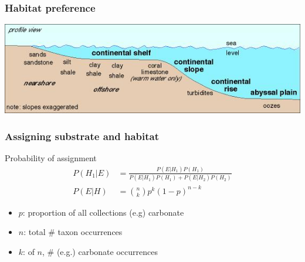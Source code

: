 \documentclass{beamer}
\begin{document}
\begin{frame}
  \frametitle{Habitat preference}
  \begin{center}
    \includegraphics[height = 0.8\textheight, width = \textwidth, keepaspectratio = true]{figure/coast_dep}

    \tiny{}
  \end{center}
\end{frame}

\begin{frame}
  \frametitle{Assigning substrate and habitat}

  \begin{block}{Probability of assignment}
    \begin{align*}
      P(H_{1}|E) &= \frac{P(E|H_{1})P(H_{1})}{P(E|H_{1})P(H_{1}) + P(E|H_{2})P(H_{2})} \\
      P(E|H) &= \binom{n}{k} p^{k}(1 - p)^{n - k}
    \end{align*}

    \begin{itemize}
      \item \(p\): proportion of all collections (e.g) carbonate
      \item \(n\): total \# taxon occurrences
      \item \(k\): of \(n\), \# (e.g.) carbonate occurrences
    \end{itemize}
  \end{block}
  
  \tiny{}
\end{frame}
\end{document}
